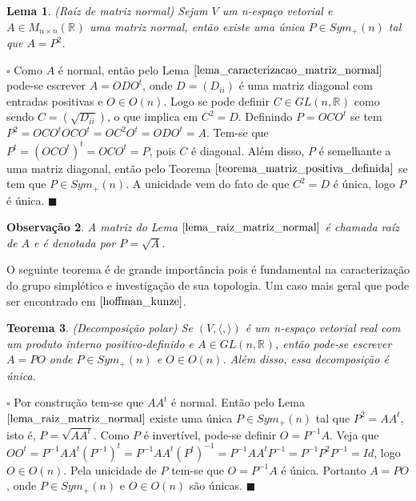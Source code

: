 \documentclass[12pt]{book}
\newtheorem{teorema}{Teorema}[section]
\newtheorem{lema}[teorema]{Lema}
\newtheorem{observacao}[teorema]{Observação}
\newenvironment{prova}[1]{$\square$ #1}{\hfill$\blacksquare$}
\newcommand{\generalgroup}[2]{GL(#1, #2)}
\newcommand{\generalgroupreal}[1]{\generalgroup{#1}{\real{}}}
\newcommand{\matrizortogonal}[1]{O(#1)}
\newcommand{\matrizquadreal}[1]{M_{#1 \times #1}(\real{})}
\newcommand{\matrizsimetricapositiva}[1]{Sym_{+}(#1)}
\newcommand{\produtointerno}[2]{\langle #1, #2 \rangle}
\newcommand{\real}[1]{\mathbb{R}^{#1}}
\begin{document}
	\begin{lema}\label{lema_raiz_matriz_normal}
		(Raíz de matriz normal) Sejam $V$ um n-espaço vetorial e $A\in \matrizquadreal{n}$ uma matriz normal, então existe uma única $P\in \matrizsimetricapositiva{n}$ tal que $A=P^{2}$. 
	\end{lema}
	\begin{prova}
		Como $A$ é normal, então pelo Lema $\ref{lema_caracterizacao_matriz_normal}$ pode-se escrever $A=ODO^{t}$, onde $D=(D_{ii})$ é uma matriz diagonal com entradas positivas e $O\in \matrizortogonal{n}$. Logo se pode definir $C \in \generalgroupreal{n}$ como sendo $C = (\sqrt{D_{ii}})$, o que implica em $C^{2} = D$. Definindo $P = OCO^{t}$ se tem $P^{2} = OCO^{t}OCO^{t} = OC^{2}O^{t} = ODO^{t}=A$. Tem-se que $P^{t} = (OCO^{t})^{t} = OCO^{t} = P$, pois $C$ é diagonal. Além disso, $P$ é semelhante a uma matriz diagonal, então pelo Teorema $\ref{teorema_matriz_positiva_definida}$ se tem que $P \in \matrizsimetricapositiva{n}$. A unicidade vem do fato de que $C^{2} = D$ é única, logo $P$ é única.
	\end{prova}
	
	\begin{observacao}\label{observacao_raiz_matriz_normal}
		A matriz do Lema $\ref{lema_raiz_matriz_normal}$ é chamada raíz de $A$ e é denotada por $P=\sqrt{A}$.
	\end{observacao}
	
	O seguinte teorema é de grande importância pois é fundamental na caracterização do grupo simplético e investigação de sua topologia. Um caso mais geral que pode ser encontrado em $\cite{hoffman_kunze}$.
	
	\begin{teorema}\label{teorema_decomposicao_polar}
		(Decomposição polar) Se $(V, \produtointerno{}{})$ é um n-espaço vetorial real com um produto interno positivo-definido e $A \in \generalgroupreal{n}$, então pode-se escrever $A=PO$ onde $P \in  \matrizsimetricapositiva{n}$ e $O \in \matrizortogonal{n}$. Além disso, essa decomposição é única.
	\end{teorema}
	\begin{prova}
		Por construção tem-se que $AA^{t}$ é normal. Então pelo Lema $\ref{lema_raiz_matriz_normal}$ existe uma única $P \in \matrizsimetricapositiva{n}$ tal que $P^{2} = AA^{t}$, isto é, $P = \sqrt{AA^{t}}$. Como $P$ é invertível, pode-se definir $O = P^{-1}A$. Veja que $OO^{t} = P^{-1}AA^{t}(P^{-1})^{t} = P^{-1}AA^{t}(P^{t})^{-1} = P^{-1}AA^{t}P^{-1} = P^{-1}P^{2}P^{-1} = Id$, logo $O \in \matrizortogonal{n}$. Pela unicidade de $P$ tem-se que $O=P^{-1}A$ é única. Portanto $A=PO$, onde $P \in \matrizsimetricapositiva{n}$ e $O \in \matrizortogonal{n}$ são únicas.
	\end{prova}
	
\end{document}
